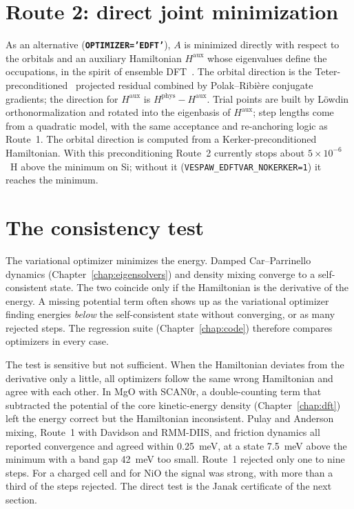 \documentclass[11pt,a4paper,oneside]{book}
\newcommand{\scanzero}{SCAN0r}
\newcommand{\key}[1]{\textbf{\texttt{#1}}}
\begin{document}
\section{Route 2: direct joint minimization}

As an alternative (\key{OPTIMIZER='EDFT'}), $A$ is minimized directly with
respect to the orbitals and an auxiliary Hamiltonian $H^{\mathrm{aux}}$
whose eigenvalues define the occupations, in the spirit of ensemble
DFT~\cite{MarzariVanderbiltPayne1997,FreysoldtBoeckNeugebauer2009}. The
orbital direction is the Teter-preconditioned~\cite{TeterPayneAllan1989}
projected residual combined by Polak--Ribi\`ere conjugate gradients; the
direction for $H^{\mathrm{aux}}$ is $H^{\mathrm{phys}}-H^{\mathrm{aux}}$.
Trial points are built by L\"owdin orthonormalization and rotated into
the eigenbasis of $H^{\mathrm{aux}}$; step lengths come from a quadratic
model, with the same acceptance and re-anchoring logic as Route~1. The
orbital direction is computed from a Kerker-preconditioned Hamiltonian.
With this preconditioning Route~2 currently stops about $5\times10^{-6}$~H
above the minimum on Si; without it (\texttt{VESPAW\_EDFTVAR\_NOKERKER=1}) it
reaches the minimum.

\section{The consistency test}\label{sec:consistency}

The variational optimizer minimizes the energy. Damped Car--Parrinello
dynamics (Chapter~\ref{chap:eigensolvers}) and density mixing converge to
a self-consistent state. The two coincide only if the Hamiltonian is the
derivative of the energy. A missing potential term often shows up as
the variational optimizer finding energies \emph{below} the
self-consistent state without converging, or as many rejected steps.
The regression suite (Chapter~\ref{chap:code}) therefore compares
optimizers in every case.

The test is sensitive but not sufficient. When the Hamiltonian deviates
from the derivative only a little, all optimizers follow the same wrong
Hamiltonian and agree with each other. In MgO with \scanzero, a
double-counting term that subtracted the potential of the core
kinetic-energy density (Chapter~\ref{chap:dft}) left the energy correct
but the Hamiltonian inconsistent. Pulay and Anderson mixing, Route~1
with Davidson and RMM-DIIS, and friction dynamics all reported
convergence and agreed within 0.25~meV, at a state 7.5~meV above the
minimum with a band gap 42~meV too small. Route~1 rejected only one to
nine steps. For a charged cell and for NiO the signal was strong, with
more than a third of the steps rejected. The direct test is the Janak
certificate of the next section.
\end{document}
